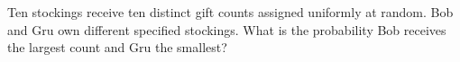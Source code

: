 Ten stockings receive ten distinct gift counts assigned uniformly at random. Bob and Gru own different specified stockings. What is the probability Bob receives the largest count and Gru the smallest?
